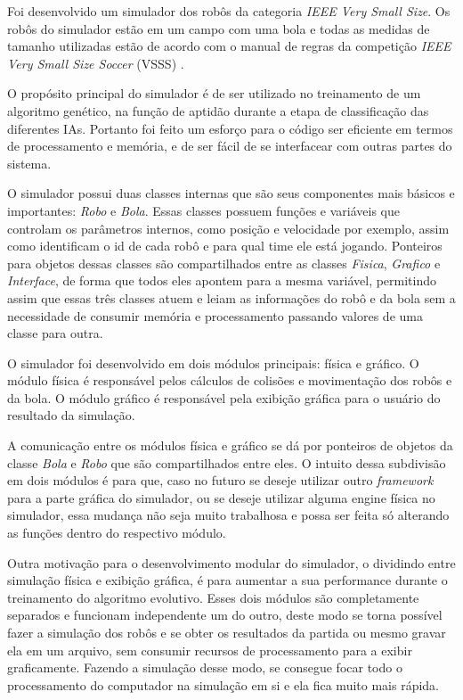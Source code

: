 Foi desenvolvido um simulador dos robôs da categoria \textit{IEEE Very Small Size}. Os robôs do simulador estão em um campo com uma bola e todas as medidas de tamanho utilizadas estão de acordo com o manual de regras da competição \textit{IEEE Very Small Size Soccer} (VSSS) \cite{IEEE2008}.

O propósito principal do simulador é de ser utilizado no treinamento de um algoritmo genético, na função de aptidão durante a etapa de classificação das diferentes IAs. Portanto foi feito um esforço para o código ser eficiente em termos de processamento e memória, e de ser fácil de se interfacear com outras partes do sistema.

O simulador possui duas classes internas que são seus componentes mais básicos e importantes: \textit{Robo} e \textit{Bola}. Essas classes possuem funções e variáveis que controlam os parâmetros internos, como posição e velocidade por exemplo, assim como identificam o id de cada robô e para qual time ele está jogando. Ponteiros para objetos dessas classes são compartilhados entre as classes \textit{Fisica}, \textit{Grafico} e \textit{Interface}, de forma que todos eles apontem para a mesma variável, permitindo assim que essas três classes atuem e leiam as informações do robô e da bola sem a necessidade de consumir memória e processamento passando valores de uma classe para outra.

O simulador foi desenvolvido em dois módulos principais: física e gráfico. O módulo física é responsável pelos cálculos de colisões e movimentação dos robôs e da bola. O módulo gráfico é responsável pela exibição gráfica para o usuário do resultado da simulação.

A comunicação entre os módulos física e gráfico se dá por ponteiros de objetos da classe \textit{Bola} e \textit{Robo} que são compartilhados entre eles. O intuito dessa subdivisão em dois módulos é para que, caso no futuro se deseje utilizar outro \textit{framework} para a parte gráfica do simulador, ou se deseje utilizar alguma engine física no simulador, essa mudança não seja muito trabalhosa e possa ser feita só alterando as funções dentro do respectivo módulo.

Outra motivação para o desenvolvimento modular do simulador, o dividindo entre simulação física e exibição gráfica, é para aumentar a sua performance durante o treinamento do algoritmo evolutivo. Esses dois módulos são completamente separados e funcionam independente um do outro, deste modo se torna possível fazer a simulação dos robôs e se obter os resultados da partida ou mesmo gravar ela em um arquivo, sem consumir recursos de processamento para a exibir graficamente. Fazendo a simulação desse modo, se consegue focar todo o processamento do computador na simulação em si e ela fica muito mais rápida.

